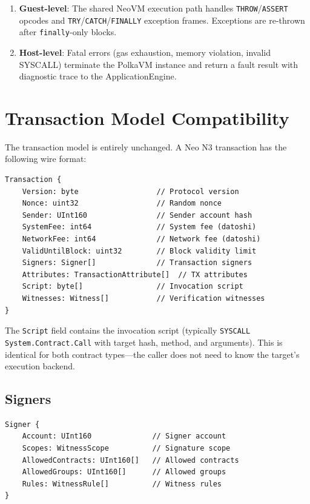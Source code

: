 \documentclass[11pt,a4paper]{article}
\begin{document}
\begin{enumerate}[noitemsep]
    \item \textbf{Guest-level}: The shared NeoVM execution path handles
          \texttt{THROW}/\texttt{ASSERT} opcodes and
          \texttt{TRY}/\texttt{CATCH}/\texttt{FINALLY} exception frames.
          Exceptions are re-thrown after \texttt{finally}-only blocks.
    \item \textbf{Host-level}: Fatal errors (gas exhaustion, memory
          violation, invalid SYSCALL) terminate the PolkaVM instance and
          return a fault result with diagnostic trace to the
          ApplicationEngine.
\end{enumerate}

\section{Transaction Model Compatibility}
\label{sec:transactions}

The transaction model is entirely unchanged. A Neo N3 transaction has the
following wire format:

\begin{lstlisting}[caption={Neo N3 transaction structure}]
Transaction {
    Version: byte                  // Protocol version
    Nonce: uint32                  // Random nonce
    Sender: UInt160                // Sender account hash
    SystemFee: int64               // System fee (datoshi)
    NetworkFee: int64              // Network fee (datoshi)
    ValidUntilBlock: uint32        // Block validity limit
    Signers: Signer[]              // Transaction signers
    Attributes: TransactionAttribute[]  // TX attributes
    Script: byte[]                 // Invocation script
    Witnesses: Witness[]           // Verification witnesses
}
\end{lstlisting}

The \texttt{Script} field contains the invocation script (typically
\texttt{SYSCALL System.Contract.Call} with target hash, method, and
arguments). This is identical for both contract types---the caller does not
need to know the target's execution backend.

\subsection{Signers}

\begin{lstlisting}[caption={Signer structure (unchanged)}]
Signer {
    Account: UInt160              // Signer account
    Scopes: WitnessScope          // Signature scope
    AllowedContracts: UInt160[]   // Allowed contracts
    AllowedGroups: UInt160[]      // Allowed groups
    Rules: WitnessRule[]          // Witness rules
}
\end{lstlisting}
\end{document}
